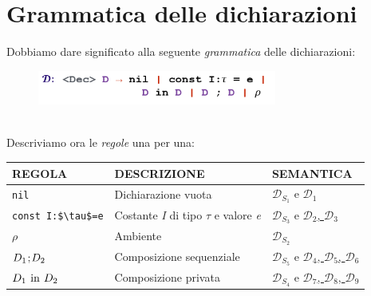 \documentclass[a4paper,oneside,titlepage]{book}
\begin{document}
\section{Grammatica delle dichiarazioni}
Dobbiamo dare significato alla seguente \textit{grammatica} delle dichiarazioni:
\begin{figure}[htp]
	\centering
	\includegraphics[width=0.7\textwidth]{dec.png}
\end{figure}
\\
Descriviamo ora le \textit{regole} una per una:
\begin{center}
	\begin{tabular}{lll}
		\toprule
		\textbf{REGOLA} & \textbf{DESCRIZIONE} & \textbf{SEMANTICA} \\
		
		\midrule
		\lstinline|nil| & Dichiarazione vuota & \hyperref[sec:decSemStat1]{$\mathcal{D}_{S_1}$} e \hyperref[sec:decSemDin1]{$\mathcal{D}_1$} \\
		
		\midrule
		\lstinline|const I:$\tau$=e| & Costante \textit{I} di tipo $\tau$ e valore \textit{e} & \hyperref[sec:decSemStat1]{$\mathcal{D}_{S_3}$} e \hyperref[sec:decSemDin1]{$\mathcal{D}_2$, $\mathcal{D}_3$} \\
		
		\midrule
		$\rho$ & Ambiente & \hyperref[sec:decSemStat1]{$\mathcal{D}_{S_2}$} \\
		
		\midrule
		$D_1 \text{\lstinline|;|} D_2$ & Composizione sequenziale & \hyperref[sec:decSemStat1]{$\mathcal{D}_{S_5}$} e \hyperref[sec:decSemDin1]{$\mathcal{D}_4$, $\mathcal{D}_5$, $\mathcal{D}_6$} \\
		
		\midrule
		$D_1 \text{ \lstinline|in| } D_2$ & Composizione privata & \hyperref[sec:decSemStat1]{$\mathcal{D}_{S_4}$} e \hyperref[sec:decSemDin1]{$\mathcal{D}_7$, $\mathcal{D}_8$, $\mathcal{D}_9$} \\
		
		\bottomrule
	\end{tabular}
\end{center}
\end{document}

